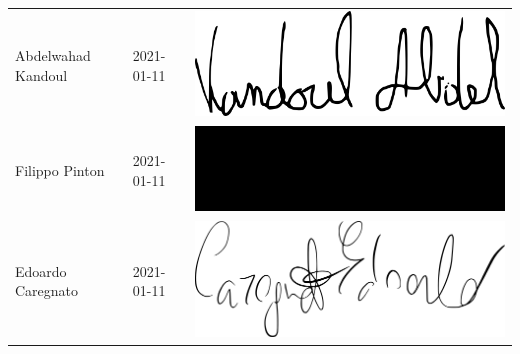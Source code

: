 {\begin{longtable}{ C{5cm} C{4cm} C{5cm} }
		{Abdelwahad Kandoul} & 2021-01-11 & \includegraphics[scale=0.20]{./src/Organigramma/immagini/firme/abdel.png}\\
		{Filippo Pinton} & 2021-01-11 & \includegraphics[scale=0.20]{./src/Organigramma/immagini/firme/filippo.png}\\
		{Edoardo Caregnato} & 2021-01-11 & \includegraphics[scale=0.20]{./src/Organigramma/immagini/firme/edoardo.png}
	\end{longtable}
}


